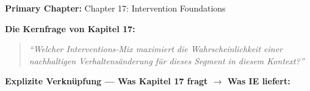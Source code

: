 
\begin{tcolorbox}[colback=purple!5!white, colframe=purple!75!black,
    title=Chapter Linkage]

\textbf{Primary Chapter:} Chapter 17: Intervention Foundations

\vspace{0.3em}
\textbf{Die Kernfrage von Kapitel 17:}
\begin{quote}
\textit{``Welcher Interventions-Mix maximiert die Wahrscheinlichkeit einer nachhaltigen Verhaltensänderung für dieses Segment in diesem Kontext?''}
\end{quote}

\textbf{Explizite Verknüpfung --- Was Kapitel 17 fragt $\to$ Was IE liefert:}


\end{tcolorbox}
